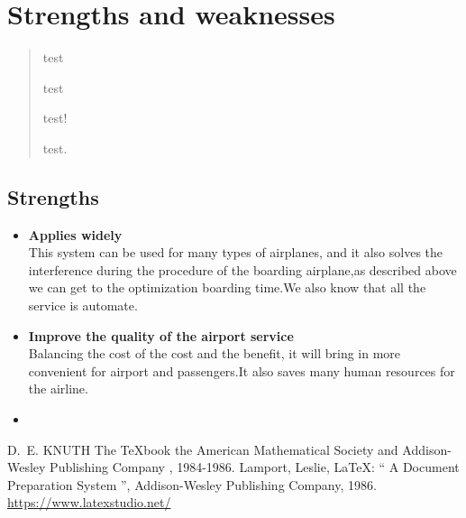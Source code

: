 \documentclass{mcmthesis}
\begin{document}
\section{Strengths and weaknesses}
\lipsum[12]

\begin{quotation}
  test

  test

  test!

  test.
\end{quotation}

\subsection{Strengths}
\begin{itemize}
\item \textbf{Applies widely}\\
This  system can be used for many types of airplanes, and it also
solves the interference during  the procedure of the boarding
airplane,as described above we can get to the  optimization
boarding time.We also know that all the service is automate.
\item \textbf{Improve the quality of the airport service}\\
Balancing the cost of the cost and the benefit, it will bring in
more convenient  for airport and passengers.It also saves many
human resources for the airline. \item \textbf{}
\end{itemize}

\begin{thebibliography}{99}
 D.~E. KNUTH   The \TeX{}book  the American
Mathematical Society and Addison-Wesley
Publishing Company , 1984-1986.
Lamport, Leslie,  \LaTeX{}: `` A Document Preparation System '',
Addison-Wesley Publishing Company, 1986.
\url{https://www.latexstudio.net/}
\end{thebibliography}
\end{document}
